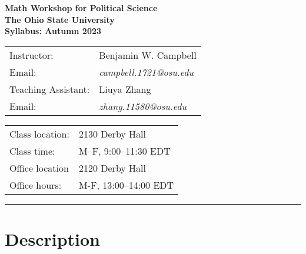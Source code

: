 \documentclass[12pt]{article}
\newcommand{\flexrule}[2]{
  \begin{center}
    \rule{#1\textwidth}{#2}
  \end{center}
}
\begin{document}
\normalem


\thispagestyle{empty}
\begin{center}
  {\huge\bfseries Math Workshop for Political Science} \\[0.5em]
  {\LARGE\bfseries The Ohio State University} \\[0.5em]
  {\large\bfseries Syllabus: Autumn 2023} \\

  \vspace{2.5em}

  \begin{minipage}{0.4\linewidth} \flushleft
    \begin{tabular}{ll}
      Instructor:         & Benjamin W. Campbell \\
      Email:              & \emph{campbell.1721}\emph{\small @}\emph{osu.edu} \\[1.0em]
      Teaching Assistant: & Liuya Zhang \\
      Email:              & \emph{zhang.11580}\emph{\small @}\emph{osu.edu}
    \end{tabular}
  \end{minipage}
  \hspace{0.14\linewidth}
  \begin{minipage}{0.44\linewidth} \flushleft
    \begin{tabular}{ll}
      Class location: & 2130 Derby Hall \\
      Class time:     & M--F, 9:00--11:30 EDT \\[1.0em]
      Office location & 2120 Derby Hall \\
      Office hours:   & M-F, 13:00--14:00 EDT
    \end{tabular}
  \end{minipage}
\end{center}

\vspace{0.5em}


\flexrule{1.0}{0.5pt}

\section*{Description}
\end{document}
